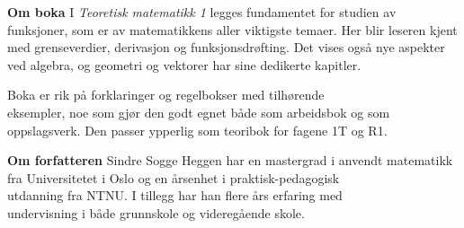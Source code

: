 


\newpage
\pagecolor{SeaGreen!40}
\thispagestyle{empty}
\large
\textbf{Om boka}\os
I \textit{Teoretisk matematikk 1} legges fundamentet for studien av funksjoner, som er av matematikkens aller viktigste temaer. Her blir leseren kjent med grenseverdier, derivasjon og funksjonsdrøfting. Det vises også nye aspekter ved algebra, og geometri og vektorer har sine dedikerte kapitler. \vsk

Boka er rik på forklaringer og regelbokser med tilhørende \\ eksempler, noe som gjør den godt egnet både som arbeidsbok og som oppslagsverk. Den passer ypperlig som teoribok for fagene 1T og R1. 

\vsk \vsk


\textbf{Om forfatteren} \os
Sindre Sogge Heggen har en mastergrad i anvendt matematikk fra Universitetet i Oslo og en årsenhet i praktisk-pedagogisk\\ utdanning fra NTNU. I tillegg har han flere års erfaring med\\ undervisning i både grunnskole og videregående skole.
